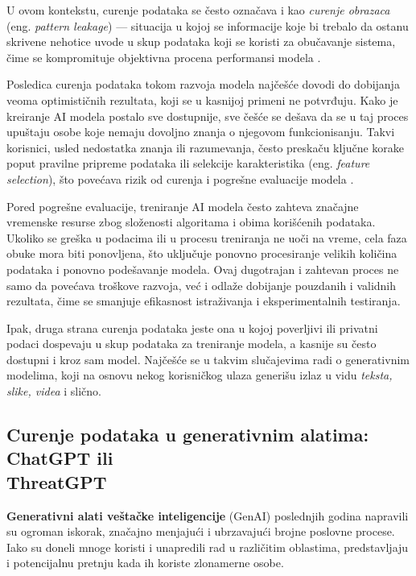\documentclass[a4paper,12pt]{article}
\begin{document}
U ovom kontekstu, curenje podataka se često označava i kao \textit{curenje obrazaca} (eng. \textit{pattern leakage}) — situacija u kojoj se informacije koje bi trebalo da ostanu skrivene nehotice uvode u skup podataka koji se koristi za obučavanje sistema, čime se kompromituje objektivna procena performansi modela \cite{apicella2024dontpushbuttonexploring}. 

Posledica curenja podataka tokom razvoja modela najčešće dovodi do dobijanja veoma optimističnih rezultata, koji se u kasnijoj primeni ne potvrđuju. Kako je kreiranje AI modela postalo sve dostupnije, sve češće se dešava da se u taj proces upuštaju osobe koje nemaju dovoljno znanja o njegovom funkcionisanju. Takvi korisnici, usled nedostatka znanja ili razumevanja, često preskaču ključne korake poput pravilne pripreme podataka ili selekcije karakteristika (eng. \textit{feature selection}), što povećava rizik od curenja i pogrešne evaluacije modela \cite{apicella2024dontpushbuttonexploring}. 

Pored pogrešne evaluacije, treniranje AI modela često zahteva značajne vremenske resurse zbog složenosti algoritama i obima korišćenih podataka. Ukoliko se greška u podacima ili u procesu treniranja ne uoči na vreme, cela faza obuke mora biti ponovljena, što uključuje ponovno procesiranje velikih količina podataka i ponovno podešavanje modela. Ovaj dugotrajan i zahtevan proces ne samo da povećava troškove razvoja, već i odlaže dobijanje pouzdanih i validnih rezultata, čime se smanjuje efikasnost istraživanja i eksperimentalnih testiranja.

Ipak, druga strana curenja podataka jeste ona u kojoj poverljivi ili privatni podaci dospevaju u skup podataka za treniranje modela, a kasnije su često dostupni i kroz sam model. Najčešće se u takvim slučajevima radi o generativnim modelima, koji na osnovu nekog korisničkog ulaza generišu izlaz u vidu \textit{teksta, slike, videa} i slično.

\subsection{Curenje podataka u generativnim alatima: ChatGPT ili\\ThreatGPT}

\textbf{Generativni alati veštačke inteligencije} (GenAI) poslednjih godina napravili su ogroman iskorak, značajno menjajući i ubrzavajući brojne poslovne procese. Iako su doneli mnoge koristi i unapredili rad u različitim oblastima, predstavljaju i potencijalnu pretnju kada ih koriste zlonamerne osobe.
\end{document}
